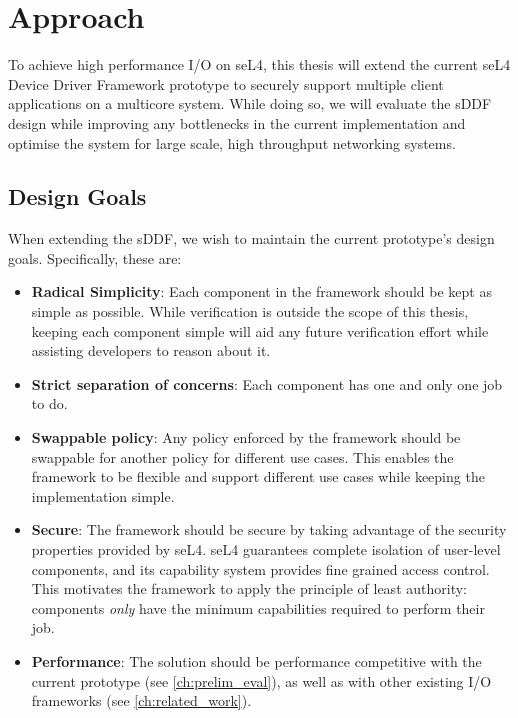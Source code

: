 \chapter{Approach}\label{ch:approach}
To achieve high performance I/O on seL4, this thesis will extend the current seL4 Device Driver Framework prototype 
to securely support multiple client applications on a multicore system. While doing so, 
we will evaluate the sDDF design while improving any bottlenecks in the current implementation
and optimise the system for large scale, high throughput networking systems.

\section{Design Goals}
When extending the sDDF, we wish to maintain the current prototype's design goals. 
Specifically, these are:
\begin{itemize}
\item \textbf{Radical Simplicity}: Each component in the framework should be kept as simple as possible. While verification is outside the scope
of this thesis, keeping each component simple will aid any future verification effort while assisting developers to reason about it.
\item \textbf{Strict separation of concerns}: Each component has one and only one job to do. 
\item \textbf{Swappable policy}: Any policy enforced by the framework should be swappable for another policy for different use cases.
This enables the framework to be flexible and support different use cases while keeping the implementation simple.
\item \textbf{Secure}: The framework should be secure by taking advantage of the security properties provided by seL4. seL4 guarantees
complete isolation of user-level components, and its capability system provides fine grained access control. This motivates the framework to apply
the principle of least authority: components \emph{only} have the minimum capabilities required to perform their job.
\item \textbf{Performance}: The solution should be performance competitive with the current prototype (see \autoref{ch:prelim_eval}),
as well as with other existing I/O frameworks (see \autoref{ch:related_work}).
\end{itemize}


